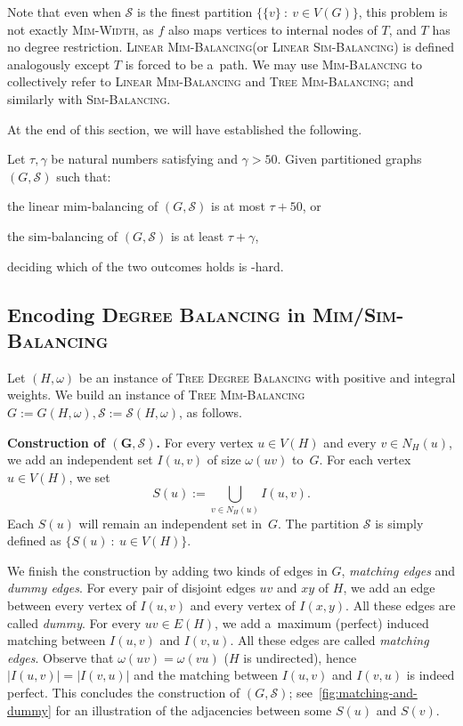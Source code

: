 \documentclass[a4paper,UKenglish,cleveref,hyperref,autoref]{lipics-v2021}
\newcommand{\weight}{\omega}
\newcommand{\tdb}{\textsc{Tree Degree Balancing}\xspace}
\newcommand{\tmb}{\textsc{Tree Mim-Balancing}\xspace}
\newcommand{\lmb}{\textsc{Linear Mim-Balancing}\xspace}
\newcommand{\lsb}{\textsc{Linear Sim-Balancing}\xspace}
\begin{document}
Note that even when $\mathcal S$ is the finest partition $\{\{v\}~:~v \in V(G)\}$, this problem is not exactly \textsc{Mim-Width}, as $f$ also maps vertices to internal nodes of $T$, and $T$ has no degree restriction.
\lmb (or \lsb) is defined analogously except $T$ is forced to be a~path.
We may use \textsc{Mim-Balancing} to collectively refer to \lmb and \tmb; and similarly with \textsc{Sim-Balancing}.

At the end of this section, we will have established the following.

\begin{theorem}
  Let $\tau, \gamma$ be natural numbers satisfying  and $\gamma > 50$.
  Given partitioned graphs $(G,\mathcal S)$ such that:
  \begin{compactitem}
  \item the linear mim-balancing of $(G, \mathcal{S})$ is at most $\tau + 50$, or
  \item the sim-balancing of $(G, \mathcal{S})$ is at least $\tau + \gamma$,
  \end{compactitem}
  deciding which of the two outcomes holds is \NP-hard.
\end{theorem}

\subsection{Encoding \textsc{Degree Balancing} in \textsc{Mim/Sim-Balancing}}

Let $(H, \weight)$ be an instance of \tdb with positive and integral weights.
We build an instance of \tmb $G := G(H, \weight), \mathcal S := \mathcal{S}(H, \weight)$, as follows.

\medskip

\textbf{Construction of $\bm{(G,\mathcal S)}$.}
For every vertex $u \in V(H)$ and every $v \in N_H(u)$, we add an independent set $I(u, v)$ of size $\weight(uv)$ to~$G$.
For each vertex $u \in V(H)$, we set~$$S(u) := \bigcup_{v \in N_H(u)} I(u, v).$$
Each $S(u)$ will remain an independent set in~$G$.
The partition $\mathcal S$ is simply defined as $\{S(u)~:~u \in V(H)\}$.

We finish the construction by adding two kinds of edges in $G$, \emph{matching edges} and \emph{dummy edges}. 
For every pair of disjoint edges $uv$ and $xy$ of $H$, we add an edge between every vertex of $I(u, v)$ and every vertex of $I(x, y)$.
%
All these edges are called \emph{dummy}.
For every $uv \in E(H)$, we add a~maximum (perfect) induced matching between $I(u,v)$ and $I(v,u)$.
All these edges are called \emph{matching edges}.
Observe that $\weight(uv)=\weight(vu)$ ($H$ is undirected), hence $|I(u,v)|=|I(v,u)|$ and the matching between $I(u,v)$ and $I(v,u)$ is indeed perfect.  
This concludes the construction of $(G, \mathcal S)$; see~\cref{fig:matching-and-dummy} for an illustration of the adjacencies between some $S(u)$ and $S(v)$.
\end{document}
